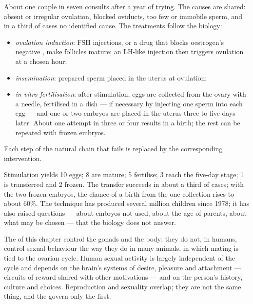 \begin{proposition}\label{prop:g11:hormones-and-reproduction:art}
About one couple in seven consults after a year of trying. The causes
are shared: absent or irregular ovulation, blocked oviducts, too few
or immobile sperm, and in a third of cases no identified cause. The
treatments follow the biology:
\begin{itemize}
  \item \emph{ovulation induction}: FSH injections, or a drug that
        blocks oestrogen's negative , make follicles mature;
        an LH-like injection then triggers ovulation at a chosen hour;
  \item \emph{insemination}: prepared sperm placed in the uterus at
        ovulation;
  \item \emph{in vitro fertilisation}: after stimulation, eggs are
        collected from the ovary with a needle, fertilised in a dish
        --- if necessary by injecting one sperm into each egg --- and
        one or two embryos are placed in the uterus three to five
        days later. About one attempt in three or four results in a
        birth; the rest can be repeated with frozen embryos.
\end{itemize}
Each step of the natural chain that fails is replaced by the
corresponding intervention.
\end{proposition}
\admitted

\begin{example}\label{ex:g11:hormones-and-reproduction:ivf}
Stimulation yields 10 eggs; 8 are mature; 5 fertilise; 3 reach the
five-day stage; 1 is transferred and 2 frozen. The transfer succeeds
in about a third of cases; with the two frozen embryos, the chance of
a birth from the one collection rises to about 60\%. The technique
has produced several million children since 1978; it has also raised
questions --- about embryos not used, about the age of parents, about
what may be chosen --- that the biology does not answer.
\end{example}

\begin{remark}\label{rem:g11:hormones-and-reproduction:brain}
The  of this chapter control the gonads and the body; they do
not, in humans, control sexual behaviour the way they do in many
animals, in which mating is tied to the ovarian cycle. Human sexual
activity is largely independent of the cycle and depends on the
brain's systems of desire, pleasure and attachment --- circuits of
reward shared with other motivations --- and on the person's history,
culture and choices. Reproduction and sexuality overlap; they are not
the same thing, and the  govern only the first.
\end{remark}

